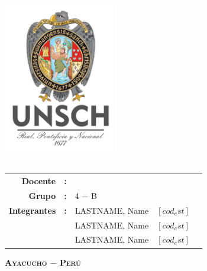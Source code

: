 \thispagestyle{empty}
\phantom{dy}
\begin{center}
	{\Large\scshape\bfseries \dyuniversity}\\
	\vspace{2.5mm}
	{\Large\scshape\bfseries \dyfaculty}\\
    \vspace{2.5mm}
	{\Large\scshape\bfseries \dydept}\\
	\vspace{8mm}
	\includegraphics[width=5cm]{src/images/logo/logounsch_a.png}\\
	
 \vspace{2pt}
	{\Large\bfseries \dycourse}\\
	\vspace{2pt}
	\vspace{5pt}

	\boxabstractd{10cm}{\bfseries\large\centering \dytema}
	\vspace{5pt}
	
 \begin{center}
		\begin{tabular}{rclcl}
			\bf Docente         & \bf: & \dyteacher{}            &   & \\[8pt]
			\bf Grupo      & \bf: &  4 $-$ B    &  & \\[5pt]
			\bf Integrantes      & \bf: &  LASTNAME, Name    & $[cod_est]$ & \\[5pt]
   			\bf       & \bf & LASTNAME, Name     & $[cod_est]$ & \\[5pt]
   			\bf       & \bf & LASTNAME, Name      & $[cod_est]$ & \\[5pt]
		\end{tabular}
	\end{center}

	\vfill
	{\Large\scshape\bfseries Ayacucho $-$ Perú}\\
	\vspace{4mm} {\Large\bfseries\dycopyrightyear}
\end{center}

\cleardoublepage{}
